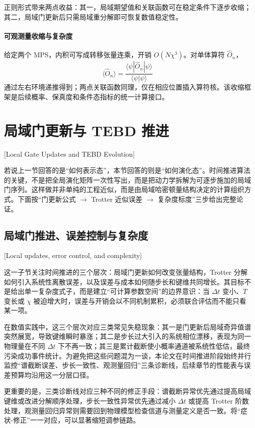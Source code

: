 正则形式带来两点收益：其一，局域期望值和关联函数可在稳定条件下逐步收缩；其二，局域门更新后只需局域重分解即可恢复数值稳定性。

\paragraph{可观测量收缩与复杂度}

给定两个 MPS，内积可写成转移张量连乘，开销 $O(N\chi^3)$。对单体算符 $\hat O_n$，
\begin{equation}
\langle\hat O_n\rangle=\frac{\langle\psi|\hat O_n|\psi\rangle}{\langle\psi|\psi\rangle}
\end{equation}
通过左右环境递推得到；两点关联函数同理，仅在相应位置插入算符核。该收缩框架是后续概率、保真度和条件态指标的统一计算接口。

\section{局域门更新与 TEBD 推进}[Local Gate Updates and TEBD Evolution]

若说上一节回答的是“如何表示态”，本节回答的则是“如何演化态”。时间推进算法的关键，不是把全局演化矩阵一次性写出，而是把动力学拆解为可逐步施加的局域门序列。这样做并非单纯的工程近似，而是由局域哈密顿量结构决定的计算组织方式。下面按“门更新公式 $\rightarrow$ Trotter 近似误差 $\rightarrow$ 复杂度标度”三步给出完整论证。

\subsection{局域门推进、误差控制与复杂度}[Local updates, error control, and complexity]

这一子节关注时间推进的三个层次：局域门更新如何改变张量结构，Trotter 分解如何引入系统性离散误差，以及误差与成本如何随步长和键维共同增长。其目标不是给出单一复杂度式子，而是建立“可计算参数空间”的边界意识：当 $\Delta t$ 变小、$T$ 变长或 $\chi$ 被迫增大时，误差与开销会以不同机制累积，必须联合评估而不能只看某一项。

在数值实践中，这三个层次对应三类常见失稳现象：其一是门更新后局域奇异值谱突然展宽，导致键维瞬时暴涨；其二是步长过大引入的系统相位漂移，表现为同一物理量在不同 $\Delta t$ 下不再一致；其三是累计截断使小概率通道被系统性低估，最终污染成功事件统计。为避免把这些问题混为一谈，本论文在时间推进阶段始终并行监控“谱截断误差、步长一致性、观测量回归”三条诊断线，后续章节的性能表与误差预算均沿用这一分层口径。

更重要的是，三类诊断线对应三种不同的修正手段：谱截断异常优先通过提高局域键维或改进分解顺序处理，步长一致性异常优先通过减小 $\Delta t$ 或提高 Trotter 阶数处理，观测量回归异常则需要回到物理模型检查信道与测量定义是否一致。将“症状-修正”一一对应，可以显著缩短调参链路。


